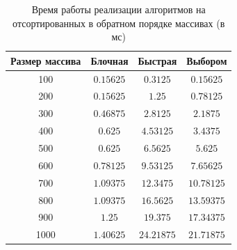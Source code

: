 \begin{table}[h]
	\begin{center}
		\begin{threeparttable}
			\captionsetup{justification=raggedright,singlelinecheck=off}
			\caption{Время работы реализации алгоритмов на отсортированных в обратном порядке массивах (в мс)}
			\label{tbl:time_measurements_sorted}
			\begin{tabular}{|c|c|c|c|}
				\hline
				Размер массива & Блочная & Быстрая & Выбором \\
				\hline
				100 &$ 0.15625 $&$ 0.3125 $&$ 0.15625 $\\
				\hline
				200 &$ 0.15625 $&$ 1.25 $&$ 0.78125 $\\
				\hline
				300 &$ 0.46875 $&$ 2.8125 $&$ 2.1875 $\\
				\hline
				400 &$ 0.625 $&$ 4.53125 $&$ 3.4375 $\\
				\hline
				500 &$ 0.625 $&$ 6.5625 $&$ 5.625 $\\
				\hline
				600 &$ 0.78125 $&$ 9.53125 $&$ 7.65625 $\\
				\hline
				700 &$ 1.09375 $&$ 12.3475 $&$ 10.78125 $\\
				\hline
				800 &$ 1.09375 $&$ 16.5625 $&$ 13.59375 $\\
				\hline
				900 &$ 1.25 $&$ 19.375 $&$ 17.34375 $\\
				\hline
				1000 &$ 1.40625 $&$ 24.21875 $&$ 21.71875 $\\
				\hline
			\end{tabular}
		\end{threeparttable}
	\end{center}
\end{table}

